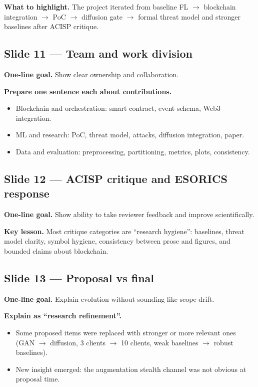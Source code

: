 \documentclass[11pt,a4paper]{article}
\begin{document}
\textbf{What to highlight.}
The project iterated from baseline FL $\rightarrow$ blockchain integration $\rightarrow$ PoC $\rightarrow$ diffusion gate $\rightarrow$ formal threat model and stronger baselines after ACISP critique.

\subsection{Slide 11 --- Team and work division}
\textbf{One-line goal.} Show clear ownership and collaboration.

\textbf{Prepare one sentence each about contributions.}
\begin{itemize}
\item Blockchain and orchestration: smart contract, event schema, Web3 integration.
\item ML and research: PoC, threat model, attacks, diffusion integration, paper.
\item Data and evaluation: preprocessing, partitioning, metrics, plots, consistency.
\end{itemize}

\subsection{Slide 12 --- ACISP critique and ESORICS response}
\textbf{One-line goal.} Show ability to take reviewer feedback and improve scientifically.

\textbf{Key lesson.}
Most critique categories are ``research hygiene'': baselines, threat model clarity, symbol hygiene, consistency between prose and figures, and bounded claims about blockchain.

\subsection{Slide 13 --- Proposal vs final}
\textbf{One-line goal.} Explain evolution without sounding like scope drift.

\textbf{Explain as ``research refinement''.}
\begin{itemize}
\item Some proposed items were replaced with stronger or more relevant ones (GAN $\rightarrow$ diffusion, 3 clients $\rightarrow$ 10 clients, weak baselines $\rightarrow$ robust baselines).
\item New insight emerged: the augmentation stealth channel was not obvious at proposal time.
\end{itemize}
\end{document}
